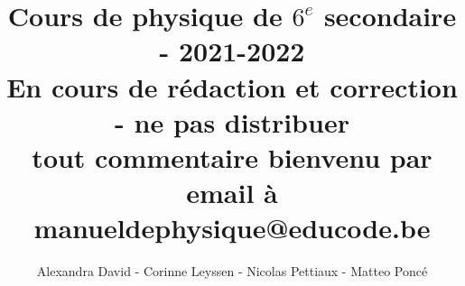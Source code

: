 \documentclass[11pt]{article}
\title{Cours de physique de $6^e$ secondaire - 2021-2022 \\
En cours de rédaction et correction - ne pas distribuer \\
tout commentaire bienvenu par email à \\
 manueldephysique@educode.be}
\author{Alexandra David - Corinne Leyssen - Nicolas Pettiaux - Matteo Poncé}
\begin{document}
\maketitle
\doclicenseThis

\setcounter{tocdepth}{10}
\renewcommand\contentsname{Table des matières}
\tableofcontents

\hrulefill




















\end{document}
